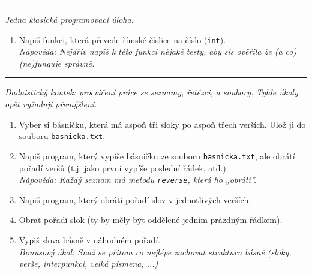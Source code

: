 \documentclass[a4paper,10pt]{article}
\newcommand\startsection[1]{
     \vspace{0.2ex}
    \hrule
    {\fontspec{Oxygen} \tiny
     \vspace{-1ex}
     \emph{#1}
     \vspace{-1.5em}
    }
}
\begin{document}

\startsection{Jedna klasická programovací úloha.}

\begin{enumerate}[resume]

\item Napiš funkci, která převede římské číslice na číslo (\verb+int+).
    \\\emph{Nápověda: Nejdřív napiš k této funkci nějaké testy, aby sis
        ověřila že (a co) (ne)funguje správně.}

\end{enumerate}

\startsection{Dadaistický koutek: procvičení práce se seznamy, řetězci,
    a soubory. Tyhle úkoly opět vyžadují přemýšlení.}

\begin{enumerate}[resume]

\item Vyber si básničku, která má aspoň tři sloky po aspoň třech verších.
    Ulož ji do souboru \verb+basnicka.txt+,

\item Napiš program, který vypíše básničku ze souboru \verb+basnicka.txt+,
    ale obrátí pořadí veršů (t.j. jako první vypíše poslední řádek, atd.)
    \\\emph{Nápověda: Každý seznam má metodu \texttt{reverse}, která ho „obrátí”.}

\item Napiš program, který obrátí pořadí slov v jednotlivých verších.

\item Obrať pořadí slok (ty by měly být oddělené jedním prázdným řádkem).

\item Vypiš slova básně v náhodném pořadí.
    \\\emph{Bonusový úkol: Snaž se přitom co nejlépe zachovat strukturu básně
        (sloky, verše, interpunkci, velká písmena, ...)}

\end{enumerate}
\end{document}
